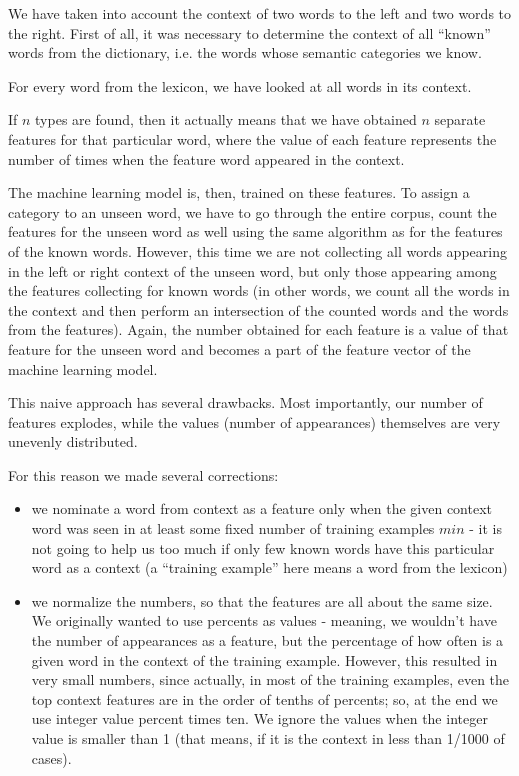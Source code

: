 \documentclass[letterpaper]{article}
\newcommand{\todofn}[1] {
 \footnote{\textbf{TODO : #1}}}
\begin{document}
We have taken into account the context of two words to the left and two words to the right. 
First of all, it was necessary to determine the context of all ``known'' words from the dictionary, i.e. the words whose semantic categories we know.  

For every word from the lexicon, we 
have looked at all words in its context.

If $n$ types are found, then it actually means that we have obtained $n$ separate 
features for that particular word, where the value of each feature represents 
the number of times when the feature word appeared in the context.
 
The machine learning model is, then, trained on these features. To assign a category
to an unseen word, we have to go through the entire corpus, count
the features for the unseen word as well using the same algorithm as for the features of the known words. However, this time we are not collecting all words appearing in the left or right context of the unseen word, but only those appearing among the features collecting for known words (in other words, we count all the words in the context and then perform an 
intersection of the counted words and the words from the features). Again, the number obtained for each feature is a value of that feature for the unseen word and becomes a part of the feature vector of the machine learning model.

This naive approach has several drawbacks. Most importantly, our number of features explodes, while the values (number of appearances) themselves are very unevenly distributed.

For this reason we made several corrections:
\begin{itemize}
    \item we nominate a word from context as a feature only when the given context word was seen in at least some fixed number of training examples $min$ - it is not going to help us too much 
if only few known words have this particular word as a context (a ``training example'' here means a word from the lexicon)
    
    \item we normalize the numbers, so that the features are all about 
the same size. We originally wanted to use percents as values - meaning, 
we wouldn't have the number of appearances as a feature, but the percentage of how often is a given word in the context of the training example.    
     However, this resulted in very small numbers, since actually, 
in most of the training examples, even the top context features are in the order of 
tenths of percents; so, at the end we use integer value percent times ten. 
We ignore the values when the integer value is smaller than 1 (that means, if it is the context in less than 1/1000 of cases).
     

\end{itemize}
\end{document}
